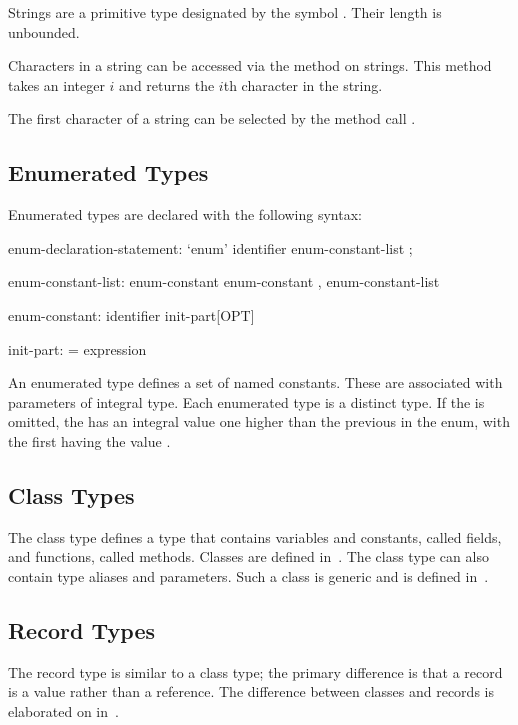 Strings are a primitive type designated by the symbol .
Their length is unbounded.

Characters in a string can be accessed via the  method
on strings.  This method takes an integer $i$ and returns the $i$th
character in the string.
\begin{example}
The first character of a string  can be selected by the method
call .
\end{example}

\subsection{Enumerated Types}
\label{Enumerated_Types}

Enumerated types are declared with the following syntax:
\begin{syntax}
enum-declaration-statement:
  `enum' identifier { enum-constant-list } ;

enum-constant-list:
  enum-constant
  enum-constant , enum-constant-list

enum-constant:
  identifier init-part[OPT]

init-part:
  = expression
\end{syntax}

An enumerated type defines a set of named constants.  These are
associated with parameters of integral type.  Each enumerated type is
a distinct type. If the  is omitted, the
 has an integral value one higher than the previous
 in the enum, with the first having the value .

\subsection{Class Types}
\label{Class_Types}

The class type defines a type that contains variables and constants,
called fields, and functions, called methods.  Classes are defined
in~.  The class type can also contain type aliases and
parameters.  Such a class is generic and is defined
in~.

\subsection{Record Types}
\label{Record_Types}

The record type is similar to a class type; the primary difference is
that a record is a value rather than a reference.  The difference
between classes and records is elaborated on in~.

